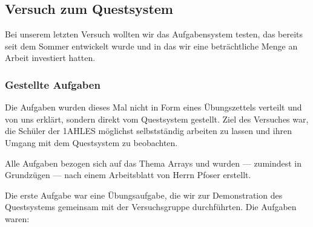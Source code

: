 

\subsection{Versuch zum Questsystem}
Bei unserem letzten Versuch wollten wir das Aufgabensystem testen, das bereits seit dem Sommer entwickelt wurde und in das wir eine beträchtliche Menge an Arbeit investiert hatten.

\subsubsection*{Gestellte Aufgaben}
Die Aufgaben wurden dieses Mal nicht in Form eines Übungszettels verteilt und von uns erklärt, sondern direkt vom Questsystem gestellt. Ziel des Versuches war, die Schüler der 1AHLES möglichst selbstständig arbeiten zu lassen und ihren Umgang mit dem Questsystem zu beobachten.

Alle Aufgaben bezogen sich auf das Thema \glqq{}Arrays\grqq{} und wurden --- zumindest in Grundzügen --- nach einem Arbeitsblatt von Herrn Pfoser erstellt.

Die erste Aufgabe war eine Übungsaufgabe, die wir zur Demonstration des Questsystems gemeinsam mit der Versuchsgruppe durchführten. Die Aufgaben waren:

